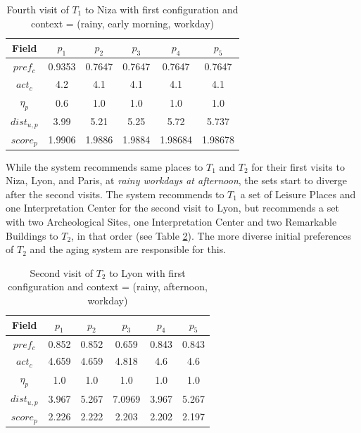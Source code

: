 \begin{table}[h!]
\vspace{-0.1cm}
\footnotesize{
    \centering
    \caption{Fourth visit of $T_1$ to Niza with first configuration and context = (rainy, early morning, workday)}
    \label{table:t1-2}
    \vspace{-0.3cm}
    \begin{tabular}{ |c|c|c|c|c|c| } 
        \hline
        Field   & $p_1$ & $p_2$ & $p_3$ & $p_4$ & $p_5$ \\
        \hline
        $pref_c$    &  0.9353 & 0.7647 & 0.7647 & 0.7647 & 0.7647 \\
        $act_c$     & 4.2 & 4.1 & 4.1 & 4.1 & 4.1 \\
        $\eta_p$    & 0.6 & 1.0 & 1.0 & 1.0 & 1.0 \\
        $dist_{u,p}$ & 3.99 & 5.21 & 5.25 & 5.72 & 5.737 \\
        $score_p$    & 1.9906 & 1.9886 & 1.9884 & 1.98684 & 1.98678 \\
        \hline
    \end{tabular}
    }
    \vspace{-0.2cm}
\end{table}

While the system recommends same places to $T_1$ and $T_2$ for their first visits to Niza, Lyon, and Paris, at {\it  rainy workdays at afternoon}, the sets start to diverge after the second visits. The system recommends to $T_1$ a set of Leisure Places and one Interpretation Center for the second visit to Lyon, but recommends a set with two Archeological Sites, one Interpretation Center and two Remarkable Buildings to $T_2$, in that order (see Table \ref{table:t2-1}). The more diverse initial preferences of $T_2$ and the aging system are responsible for this.

\begin{table}[h!]
\vspace{-0.1cm}
\footnotesize{
    \centering
        \caption{Second visit of $T_2$ to Lyon with first configuration and context = (rainy, afternoon, workday)}
    \label{table:t2-1}
    \vspace{-0.3cm}
    \begin{tabular}{ |c|c|c|c|c|c| } 
        \hline
        Field   & $p_1$ & $p_2$ & $p_3$ & $p_4$ & $p_5$ \\
        \hline
        $pref_c$    &  0.852 & 0.852 & 0.659 & 0.843 & 0.843 \\
        $act_c$     & 4.659 & 4.659 & 4.818 & 4.6 & 4.6 \\
        $\eta_p$    & 1.0 & 1.0 & 1.0 & 1.0 & 1.0 \\
        $dist_{u,p}$ & 3.967 & 5.267 & 7.0969 & 3.967 & 5.267 \\
        $score_p$    & 2.226 & 2.222 & 2.203 & 2.202 & 2.197 \\
        
        \hline
    \end{tabular}
    }
    \vspace{-0.2cm}
\end{table}

